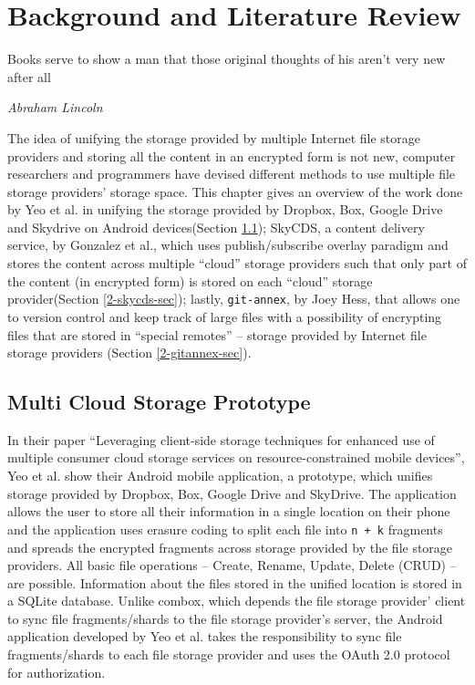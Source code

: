 \chapter{Background and Literature Review}

\epigraph{Books serve to show a man that those original thoughts of
  his aren't very new after all}{\textit{Abraham Lincoln}}

The idea of unifying the storage provided by multiple Internet file
storage providers and storing all the content in an encrypted form is
not new, computer researchers and programmers have devised different
methods to use multiple file storage providers' storage space. This
chapter gives an overview of the work done by Yeo et al. in unifying
the storage provided by Dropbox, Box, Google Drive and Skydrive on
Android devices\cite{yeo}(Section \ref{2-yeo-sec}); SkyCDS, a content
delivery service, by Gonzalez et al., which uses publish/subscribe
overlay paradigm and stores the content across multiple ``cloud''
storage providers such that only part of the content (in encrypted
form) is stored on each ``cloud'' storage
provider\cite{skycds}(Section \ref{2-skycds-sec}); lastly,
\verb+git-annex+, by Joey Hess\cite{person:joeyh}, that allows one to
version control and keep track of large files with a possibility of
encrypting files that are stored in ``special remotes'' -- storage
provided by Internet file storage providers (Section
\ref{2-gitannex-sec}).

\section{Multi Cloud Storage Prototype}\label{2-yeo-sec}

In their paper ``Leveraging client-side storage techniques for
enhanced use of multiple consumer cloud storage services on
resource-constrained mobile devices'', Yeo et al. show their Android
mobile application, a prototype, which unifies storage provided by
Dropbox, Box, Google Drive and SkyDrive. The application allows the
user to store all their information in a single location on their
phone and the application uses erasure coding\cite{weatherspoon} to
split each file into \verb`n + k` fragments and spreads the encrypted
fragments across storage provided by the file storage providers. All
basic file operations -- Create, Rename, Update, Delete (CRUD) -- are
possible. Information about the files stored in the unified location
is stored in a SQLite database. Unlike combox, which depends the file
storage provider' client to sync file fragments/shards to the file
storage provider's server, the Android application developed by Yeo et
al. takes the responsibility to sync file fragments/shards to each
file storage provider and uses the OAuth 2.0\cite{protocol:oauth2}
protocol for authorization.

